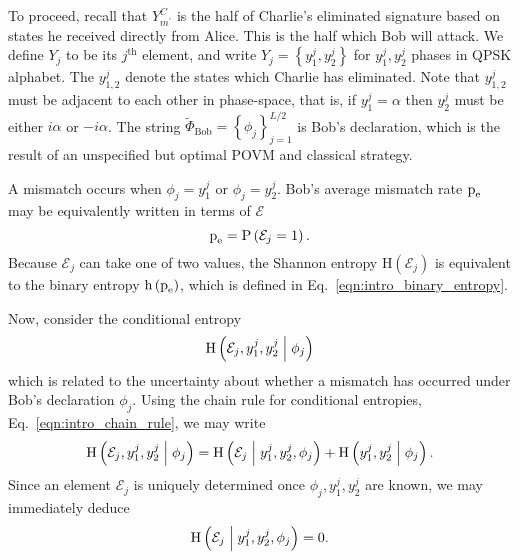 To proceed, recall that $Y_{m^\prime}^C$ is the half of Charlie's eliminated signature based on states he received directly from Alice. This is the half which Bob will attack. We define $Y_j$ to be its $j^{\text{th}}$ element, and write $Y_j = \left\{ y_1^j, y_2^j\right\}$ for $y_1^j, y_2^j$ phases in QPSK alphabet. The $y_{1,2}^j$ denote the states which Charlie has eliminated. Note that $y_{1,2}^j$ must be adjacent to each other in phase-space, that is, if $y_1^j = \alpha$ then $y_2^j$ must be either $i \alpha$ or $- i \alpha$. The string $\tilde{\Phi}_{\text{Bob}} = \left\{\phi_j\right\}_{j=1}^{L/2}$ is Bob's declaration, which is the result of an unspecified but optimal POVM and classical strategy.

A mismatch occurs when $\phi_j = y_1^j$ or $\phi_j = y_2^j$. Bob's average mismatch rate $\text{p}_{\text{e}}$ may be equivalently written in terms of $\mathcal{E}$
\begin{equation}
\text{p}_{\text{e}} = \text{P}\left(\mathcal{E}_j = 1\right). \notag
\end{equation}
Because $\mathcal{E}_j$ can take one of two values, the Shannon entropy $\text{H}\left(\mathcal{E}_j\right)$ is equivalent to the binary entropy $\text{h}\left(\text{p}_{\text{e}}\right)$, which is defined in Eq.~\ref{eqn:intro_binary_entropy}. %

Now, consider the conditional entropy
\begin{equation}
\text{H}\left(\mathcal{E}_j, y_1^j, y_2^j \; \middle| \; \phi_j\right)
\end{equation}
which is related to the uncertainty about whether a mismatch has occurred under Bob's declaration $\phi_j$. Using the chain rule for conditional entropies, Eq.~\ref{eqn:intro_chain_rule}, we may write
\begin{equation}\label{eqn:qds_pe_deriv_1}
\text{H}\left( \mathcal{E}_j, y_1^j, y_2^j \; \middle| \; \phi_j \right) = 
\text{H}\left( \mathcal{E}_j \; \middle| \; y_1^j, y_2^j, \phi_j\right) + 
\text{H}\left( y_1^j, y_2^j \; \middle| \; \phi_j\right).
\end{equation}
Since an element $\mathcal{E}_j$ is uniquely determined once $\phi_j, y_1^j, y_2^j$ are known, we may immediately deduce
\begin{equation}
\text{H}\left( \mathcal{E}_j \; \middle| \; y_1^j, y_2^j, \phi_j\right) = 0. \notag
\end{equation}

